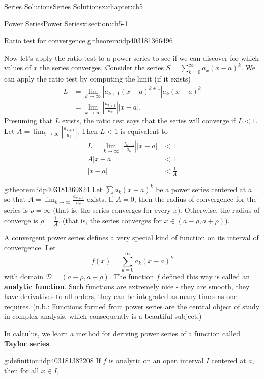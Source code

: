 \documentclass[oneside,10pt,]{book}
\newcommand{\terminology}[1]{\textbf{#1}}
\numberwithin{equation}{section}
\newcommand{\abs}[1]{\left\vert#1\right\vert}
\numberwithin{equation}{section}
\newcommand{\lt}{<}
\newcommand{\amp}{&}
\begin{document}
\begin{chapterptx}{Series Solutions}{}{Series Solutions}{}{}{x:chapter:ch5}
\begin{sectionptx}{Power Series}{}{Power Series}{}{}{x:section:ch5-1}
\begin{theorem}{Ratio test for convergence.}{}{g:theorem:idp403181366496}
\end{theorem}
Now let's apply the ratio test to a power series to see if we can discover for which values of \(x\) the series converges. Consider the series \(S = \sum_{k=0}^\infty a_x (x - a)^k\). We can apply the ratio test by computing the limit (if it exists)%
\begin{align*}
L \amp = \lim_{k \to \infty} \abs{a_{k+1}(x - a)^{k+1}}{a_k(x -a)^k}\\
\amp = \lim_{k \to \infty} \abs{\frac{a_{k+1}}{a_k}} \abs{x - a}.
\end{align*}
Presuming that \(L\) exists, the ratio test says that the series will converge if \(L \lt 1\). Let \(A = \lim_{k\to\infty} \abs{\frac{a_{k+1}}{a_k}}\). Then \(L \lt 1\) is equivalent to%
\begin{align*}
L  = \lim_{k\to\infty} \abs{\frac{a_{k+1}}{a_k}} \abs{x - a} \amp \lt 1\\
A \abs{x - a} \amp \lt 1\\
\abs{x -a} \amp \lt \frac{1}{A}
\end{align*}
%
\begin{theorem}{}{}{g:theorem:idp403181369824}%
Let \(\sum a_k (x-a)^k\) be a power series centered at \(a\) so that \(A = \lim_{k\to\infty}\frac{a_{k+1}}{a_k}\) exists. If \(A = 0\), then the radius of convergence for the series is \(\rho = \infty\) (that is, the series converges for every \(x\)). Otherwise, the radius of converge is \(\rho = \frac{1}{A}\). (that is, the series converges for \(x \in (a - \rho, a + \rho)\)).%
\end{theorem}
A convergent power series defines a very special kind of function on its interval of convergence. Let%
\begin{equation*}
f(x) = \sum_{k=0}^{\infty} a_k (x - a)^k
\end{equation*}
with domain \(\mathcal D = (a -\rho, a+\rho)\). The function \(f\) defined this way is called an \terminology{analytic function}. Such functions are extremely nice - they are smooth, they have derivatives to all orders, they can be integrated as many times as one requires. (n.b.: Functions formed from power series are the central object of study in complex analysis, which consequently is a beautiful subject.)%
\par
In calculus, we learn a method for deriving power series of a function called \terminology{Taylor series}. \begin{definition}{}{g:definition:idp403181382208}%
If \(f\) is analytic on an open interval \(I\) centered at \(a\), then for all \(x \in I\),%

\end{definition}
\end{sectionptx}
\end{chapterptx}
\end{document}
